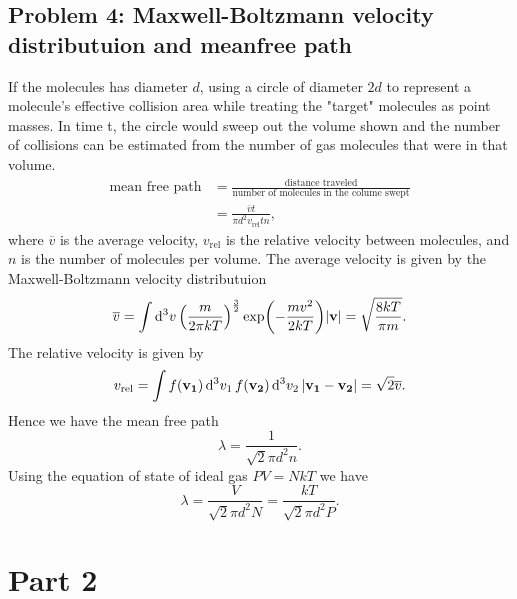 \documentclass[10pt]{article}
\begin{document}
\subsection{Problem 4: Maxwell-Boltzmann velocity distributuion and meanfree path}
If the molecules has diameter $d$, using a circle of diameter $2d$ to represent a molecule's effective collision area while treating the "target" molecules as point masses. In time t, the circle would sweep out the volume shown and the number of collisions can be estimated from the number of gas molecules that were in that volume. 
\begin{align*}
	\text{mean free path} &= \frac{\text{distance traveled}}{\text{number of molecules in the colume swept}} \\
						  &= \frac{\overline{v} t}{\pi d^2 v_{\text{rel}} t n},
\end{align*}
where $\overline{v}$ is the average velocity, $v_{\text{rel}}$ is the relative velocity between molecules, and $n$ is the number of molecules per volume. The average velocity is given by the Maxwell-Boltzmann velocity distributuion 
\begin{equation}
	\overline{v} = \int \dd[3]{v} \qty(\frac{m}{2\pi kT})^{\frac{3}{2}} \exp(-\frac{mv^2}{2 k T}) \abs{\vb{v}} = \sqrt{\frac{8kT}{\pi m}}.
\end{equation}
The relative velocity is given by 
\begin{equation}
	v_{\text{rel}} = \int f(\vb{v_1}) \dd[3]{v_1} f(\vb{v_2}) \dd[3]{v_2} \abs{\vb{v_1} - \vb{v_2}} = \sqrt{2} \overline{v}.
\end{equation}
Hence we have the mean free path 
\begin{equation}
	\lambda = \frac{1}{\sqrt{2}\pi d^2 n}.
\end{equation}
Using the equation of state of ideal gas $PV = Nk T$ we have 
\begin{equation}
	\lambda = \frac{V}{\sqrt{2}\pi d^2 N} = \frac{kT}{\sqrt{2} \pi d^2 P}.	
\end{equation}
\section{Part 2}
\end{document}
